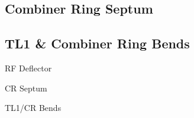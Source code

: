 
\subsection{Combiner Ring Septum}
\label{ss:crSeptum}

\subsection{TL1 \& Combiner Ring Bends}
\label{ss:crBends}


RF Deflector

CR Septum

TL1/CR Bends







